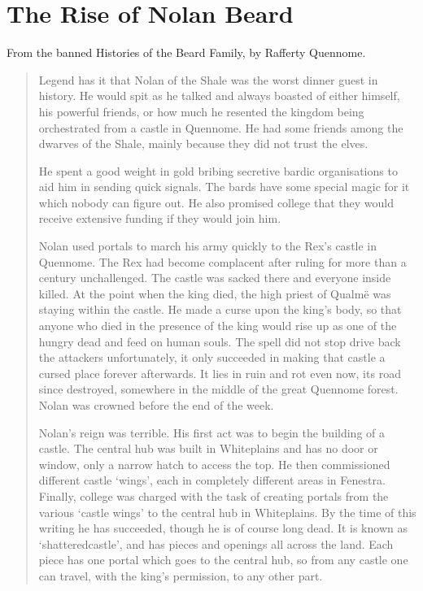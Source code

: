 \section{The Rise of Nolan Beard}
\label{nolan}

\begin{multicols}{2}

\noindent From the banned Histories of the Beard Family, by Rafferty Quennome.

\begin{quotation}

	Legend has it that Nolan of the Shale was the worst dinner guest in history.
	He would spit as he talked and always boasted of either himself, his powerful friends, or how much he resented the kingdom being orchestrated from a castle in Quennome.
	He had some friends among the dwarves of the Shale, mainly because they did not trust the elves.

	He spent a good weight in gold bribing secretive bardic organisations to aid him in sending quick signals.
	The bards have some special magic for it which nobody can figure out.
	He also promised \gls{college} that they would receive extensive funding if they would join him.

	Nolan used portals to march his army quickly to the Rex's castle in Quennome.
	The Rex had become complacent after ruling for more than a century unchallenged.
	The castle was sacked there and everyone inside killed.
	At the point when the king died, the high priest of Qualm\"{e} was staying within the castle.
	He made a curse upon the king's body, so that anyone who died in the presence of the king would rise up as one of the hungry dead and feed on human souls.
	The spell did not stop drive back the attackers unfortunately, it only succeeded in making that castle a cursed place forever afterwards.
	It lies in ruin and rot even now, its road since destroyed, somewhere in the middle of the great Quennome forest.
	Nolan was crowned before the end of the week.

	Nolan's reign was terrible.
	His first act was to begin the building of a castle.
	The central hub was built in Whiteplains and has no door or window, only a narrow hatch to access the top.
	He then commissioned different castle `wings', each in completely different areas in Fenestra.
	Finally, \gls{college} was charged with the task of creating portals from the various `castle wings' to the central hub in Whiteplains.
	By the time of this writing he has succeeded, though he is of course long dead.
	It is known as `\gls{shatteredcastle}', and has pieces and openings all across the land.
	Each piece has one portal which goes to the central hub, so from any castle one can travel, with the king's permission, to any other part.


\end{quotation}
\end{multicols}

